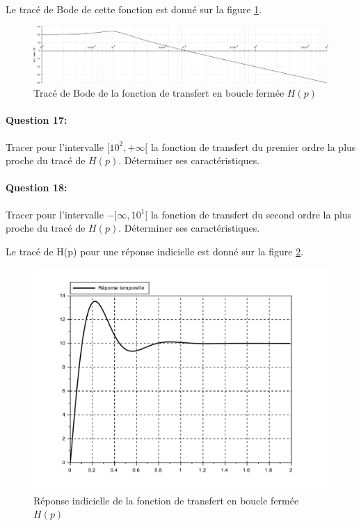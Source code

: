 ~\

Le tracé de Bode de cette fonction est donné sur la figure \ref{asserv3}.

\begin{figure}[!h]
 \centering\includegraphics[width=\linewidth]{img/bode}
 \caption{Tracé de Bode de la fonction de transfert en boucle fermée $H(p)$}
 \label{asserv3}
\end{figure}

\paragraph{Question 17:}

Tracer pour l'intervalle $[10^2,+\infty[$ la fonction de transfert du premier ordre la plus proche du tracé de $H(p)$. Déterminer ses caractéristiques.

\paragraph{Question 18:}

Tracer pour l'intervalle $-]\infty,10^1[$ la fonction de transfert du second ordre la plus proche du tracé de $H(p)$. Déterminer ses caractéristiques.

\newpage

Le tracé de H(p) pour une réponse indicielle est donné sur la figure \ref{asserv4}.

\begin{figure}[!h]
 \centering\includegraphics[width=0.6\linewidth]{img/q19}
 \caption{Réponse indicielle de la fonction de transfert en boucle fermée $H(p)$}
 \label{asserv4}
\end{figure}

